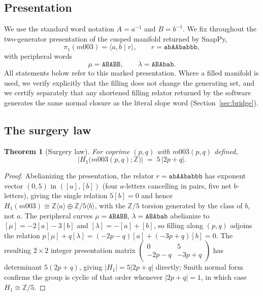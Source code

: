 \documentclass[11pt,a4paper]{article}
\newtheorem{theorem}{Theorem}[section]
\theoremstyle{definition}
\theoremstyle{remark}
\newcommand{\Zfive}{\mathbb{Z}/5}
\newcommand{\Z}{\mathbb{Z}}
\begin{document}
\subsection{Presentation}

We use the standard word notation $A = a^{-1}$ and $B = b^{-1}$. We
fix throughout the two-generator presentation of the cusped
manifold returned by SnapPy,
\begin{equation}
\pi_1(m003) = \langle a, b \mid r \rangle,
\qquad r = \texttt{abAAbabbb},
\end{equation}
with peripheral words
\begin{equation}
\mu = \texttt{ABABB}, \qquad \lambda = \texttt{ABAbab} .
\end{equation}
All statements below refer to this marked presentation. Where a filled
manifold is used, we verify explicitly that the filling does not
change the generating set, and we certify separately that any
shortened filling relator returned by the software generates the same
normal closure as the literal slope word (Section~\ref{sec:bridge}).

\subsection{The surgery law}

\begin{theorem}[Surgery law]
\label{thm:surgery}
For coprime $(p,q)$ with $m003(p,q)$ defined,
\begin{equation}
\bigl| H_1\bigl(m003(p,q);\Z\bigr) \bigr| \;=\; 5\,|2p+q| .
\end{equation}
\end{theorem}

\begin{proof}
Abelianizing the presentation, the relator $r=\texttt{abAAbabbb}$ has
exponent vector $(0,5)$ in $([a],[b])$ (four $a$-letters cancelling in
pairs, five net $b$-letters), giving the single relation $5[b]=0$ and
hence $H_1(m003) \cong \Z\langle a\rangle \oplus \Zfive\langle
b\rangle$, with the $\Zfive$ torsion generated by the class of $b$, not
$a$. The peripheral curves $\mu=\texttt{ABABB}$, $\lambda=\texttt{ABAbab}$
abelianize to $[\mu]=-2[a]-3[b]$ and $[\lambda]=-[a]+[b]$, so filling
along $(p,q)$ adjoins the relation $p[\mu]+q[\lambda]=(-2p-q)[a]+
(-3p+q)[b]=0$. The resulting $2\times2$ integer presentation matrix
$\left(\begin{smallmatrix}0 & 5\\ -2p-q & -3p+q\end{smallmatrix}\right)$
has determinant $5(2p+q)$, giving $|H_1|=5|2p+q|$ directly; Smith
normal form confirms the group is cyclic of that order whenever
$|2p+q|=1$, in which case $H_1\cong\Zfive$.
\end{proof}
\end{document}
